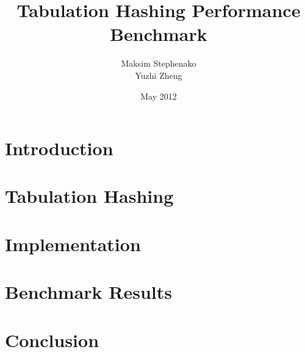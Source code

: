 \documentclass[12pt]{article}
\title{Tabulation Hashing Performance Benchmark}
\author{Maksim Stephenako \\ Yuzhi Zheng}
\date{May 2012}
\begin{document}
\setlength{\baselineskip}{1.25\baselineskip}

\ifpdf
{}
\else
{}
\fi

\maketitle

\section{Introduction}

\section{Tabulation Hashing}

\section{Implementation}

\section{Benchmark Results}

\section{Conclusion}
\end{document}
